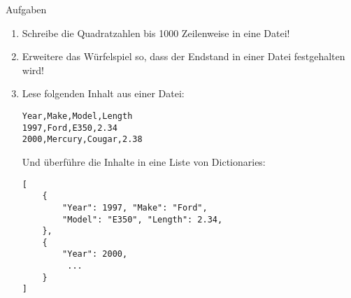 \begin{frame}[fragile]{Aufgaben}
    \begin{enumerate}
        \item Schreibe die Quadratzahlen bis 1000 Zeilenweise in eine Datei!
        \item Erweitere das Würfelspiel so, dass der Endstand in einer Datei festgehalten wird!
        \item Lese folgenden Inhalt aus einer Datei:
            \begin{verbatim}
Year,Make,Model,Length
1997,Ford,E350,2.34
2000,Mercury,Cougar,2.38\end{verbatim}
            Und überführe die Inhalte in eine Liste von Dictionaries:
            \begin{lstlisting}
[
    {
        "Year": 1997, "Make": "Ford",
        "Model": "E350", "Length": 2.34,
    },
    {
        "Year": 2000,
         ...
    }
]\end{lstlisting}
    \end{enumerate}
\end{frame}


